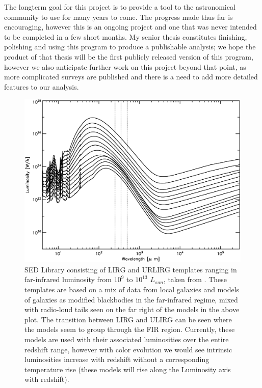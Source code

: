 \documentclass[twocolumn,letterpaper,10pt]{article}
\begin{document}
The longterm goal for this project is to provide a tool to the astronomical community to use for many years to come. The progress made thus far is encouraging, however this is an ongoing project and one that was never intended to be completed in a few short months. My senior thesis constitutes finishing, polishing and using this program to produce a publishable analysis; we hope the product of that thesis will be the first publicly released version of this program, however we also anticipate further work on this project beyond that point, as more complicated surveys are published and there is a need to add more detailed features to our analysis.




\begin{figure}
  \includegraphics[width=\textwidth,trim=0.25in 0.25in 0.25in 0.25in,clip=true]{models.eps}
  \caption{SED Library consisting of LIRG and URLIRG templates ranging in far-infrared luminosity from $10^9$ to $10^13$ $L_{sun}$, taken from \citet{rieke09}. These templates are based on a mix of data from local galaxies and models of galaxies as modified blackbodies in the far-infrared regime, mixed with radio-loud tails seen on the far right of the models in the above plot. The transition between LIRG and ULIRG can be seen where the models seem to group through the FIR region. Currently, these models are used with their associated luminosities over the entire redshift range, however with color evolution we would see intrinsic luminosities increase with redshift without a corresponding temperature rise (these models will rise along the Luminosity axis with redshift).}
  \label{slib}
\end{figure}
\end{document}
